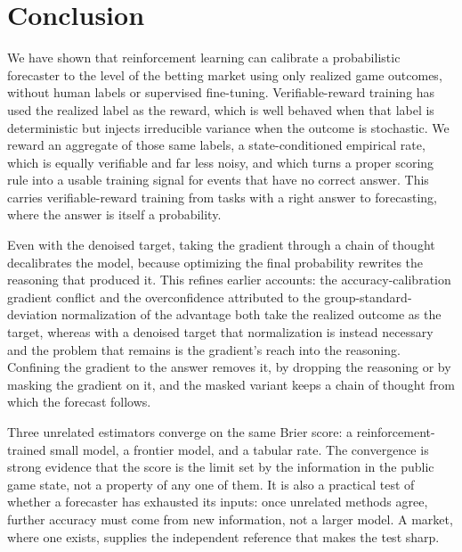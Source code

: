 \section{Conclusion}
\label{sec:conclusion}

We have shown that reinforcement learning can calibrate a probabilistic forecaster to the level of the
betting market using only realized game outcomes, without human labels or supervised fine-tuning.
Verifiable-reward training has used the realized label as the reward, which is well behaved when that
label is deterministic but injects irreducible variance when the outcome is stochastic. We reward an
aggregate of those same labels, a state-conditioned empirical rate, which is equally verifiable and far
less noisy, and which turns a proper scoring rule into a usable training signal for events that have no
correct answer. This carries verifiable-reward training from tasks with a right answer to forecasting,
where the answer is itself a probability.

Even with the denoised target, taking the gradient through a chain of thought decalibrates the model,
because optimizing the final probability rewrites the reasoning that produced it. This refines earlier
accounts: the accuracy-calibration gradient conflict \citep{dcpo} and the overconfidence attributed to
the group-standard-deviation normalization of the advantage \citep{uncalibrated_reasoning} both take the
realized outcome as the target, whereas with a denoised target that normalization is instead necessary
and the problem that remains is the gradient's reach into the reasoning. Confining the gradient to the answer
removes it, by dropping the reasoning or by masking the gradient on it, and the masked variant keeps a
chain of thought from which the forecast follows.

Three unrelated estimators converge on the same Brier score: a reinforcement-trained small model, a
frontier model, and a tabular rate. The convergence is strong evidence that the score is the limit set
by the information in the public game state, not a property of any one of them. It is also a practical
test of whether a forecaster has exhausted its inputs: once unrelated methods agree, further accuracy
must come from new information, not a larger model. A market, where one exists, supplies the
independent reference that makes the test sharp.

